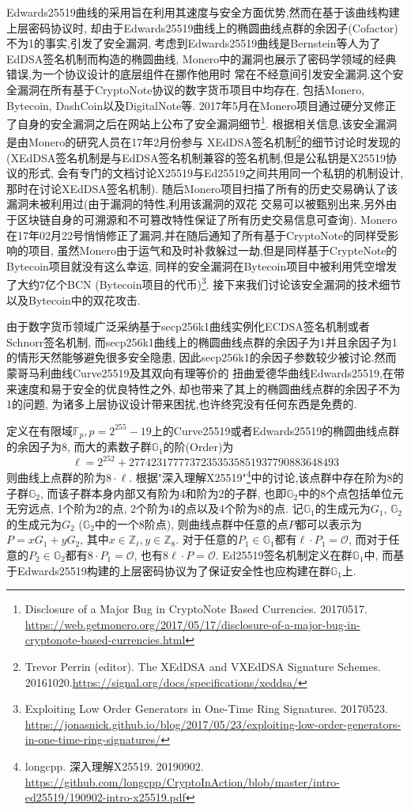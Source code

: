 \documentclass{article}
\renewcommand{\G}{\mathbb{G}}
\newcommand{\Z}{\mathbb{Z}}
\newcommand{\F}{\mathbb{F}}
\begin{document}
Edwards25519曲线的采用旨在利用其速度与安全方面优势,然而在基于该曲线构建上层密码协议时,
却由于Edwards25519曲线上的椭圆曲线点群的余因子(Cofactor)不为1的事实,引发了安全漏洞, 
考虑到Edwards25519曲线是Bernstein等人为了EdDSA签名机制而构造的椭圆曲线,
Monero中的漏洞也展示了密码学领域的经典错误,为一个协议设计的底层组件在挪作他用时
常在不经意间引发安全漏洞.这个安全漏洞在所有基于CryptoNote协议的数字货币项目中均存在,
包括Monero, Bytecoin, DashCoin以及DigitalNote等. 
2017年5月在Monero项目通过硬分叉修正了自身的安全漏洞之后在网站上公布了安全漏洞细节\footnote{
Disclosure of a Major Bug in CryptoNote Based Currencies. 20170517.
\url{https://web.getmonero.org/2017/05/17/disclosure-of-a-major-bug-in-cryptonote-based-currencies.html}}. 根据相关信息,该安全漏洞是由Monero的研究人员在17年2月份参与
XEdDSA签名机制\footnote{Trevor Perrin (editor). The XEdDSA and VXEdDSA Signature Schemes. 20161020.\url{https://signal.org/docs/specifications/xeddsa/}}的细节讨论时发现的
(XEdDSA签名机制是与EdDSA签名机制兼容的签名机制,但是公私钥是X25519协议的形式, 
会有专门的文档讨论X25519与Ed25519之间共用同一个私钥的机制设计,那时在讨论XEdDSA签名机制).
随后Monero项目扫描了所有的历史交易确认了该漏洞未被利用过(由于漏洞的特性,利用该漏洞的双花
交易可以被甄别出来,另外由于区块链自身的可溯源和不可篡改特性保证了所有历史交易信息可查询).
Monero在17年02月22号悄悄修正了漏洞,并在随后通知了所有基于CryptoNote的同样受影响的项目,
虽然Monero由于运气和及时补救躲过一劫,但是同样基于CrypteNote的Bytecoin项目就没有这么幸运,
同样的安全漏洞在Bytecoin项目中被利用凭空增发了大约7亿个BCN (Bytecoin项目的代币)\footnote{
Exploiting Low Order Generators in One-Time Ring Signatures. 20170523.
\url{https://jonasnick.github.io/blog/2017/05/23/exploiting-low-order-generators-in-one-time-ring-signatures/}}.
接下来我们讨论该安全漏洞的技术细节以及Bytecoin中的双花攻击.

由于数字货币领域广泛采纳基于secp256k1曲线实例化ECDSA签名机制或者Schnorr签名机制,
而secp256k1曲线上的椭圆曲线点群的余因子为1并且余因子为1的情形天然能够避免很多安全隐患,
因此secp256k1的余因子参数较少被讨论.然而蒙哥马利曲线Curve25519及其双向有理等价的
扭曲爱德华曲线Edwards25519,在带来速度和易于安全的优良特性之外,
却也带来了其上的椭圆曲线点群的余因子不为1的问题,
为诸多上层协议设计带来困扰,也许终究没有任何东西是免费的.

定义在有限域$\F_p, p = 2^{255}-19$上的Curve25519或者Edwards25519的椭圆曲线点群的余因子为8,
而大的素数子群$\G_1$的阶(Order)为
$$\ell = 2^{252} + 27742317777372353535851937790883648493$$
则曲线上点群的阶为$8\cdot\ell$. 根据"深入理解X25519"\footnote{
longcpp. 深入理解X25519. 20190902. 
\url{https://github.com/longcpp/CryptoInAction/blob/master/intro-ed25519/190902-intro-x25519.pdf}}中的讨论,该点群中存在阶为8的子群$\G_2$, 而该子群本身内部又有阶为4和阶为2的子群,
也即$\G_2$中的8个点包括单位元无穷远点, 1个阶为2的点, 2个阶为4的点以及4个阶为8的点.
记$\G_1$的生成元为$G_1$, $\G_2$的生成元为$G_2$ ($\G_2$中的一个8阶点), 
则曲线点群中任意的点$P$都可以表示为$P = xG_1 + yG_2$, 其中$x\in \Z_\ell, y\in\Z_8$. 
对于任意的$P_1 \in \G_1$都有$\ell \cdot P_1 = \mathcal{O}$, 
而对于任意的$P_2 \in \G_2$都有$8 \cdot P_1 = \mathcal{O}$, 
也有$8\ell\cdot P = \mathcal{O}$. Ed25519签名机制定义在群$\G_1$中, 
而基于Edwards25519构建的上层密码协议为了保证安全性也应构建在群$\G_1$上.
\end{document}
